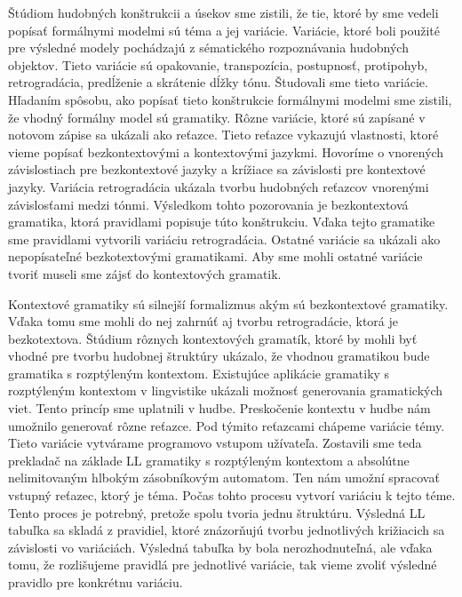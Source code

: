 Štúdiom hudobných konštrukcii a úsekov sme zistili, že tie, ktoré by sme vedeli popísať formálnymi modelmi sú téma a jej variácie. Variácie, ktoré boli použité pre výsledné modely pochádzajú z sématického rozpoznávania hudobných objektov. Tieto variácie sú opakovanie, transpozícia, postupnosť, protipohyb, retrogradácia, predĺženie a skrátenie dĺžky tónu. Študovali sme tieto variácie. Hľadaním spôsobu, ako popísať tieto konštrukcie formálnymi modelmi sme zistili, že vhodný formálny model sú gramatiky. Rôzne variácie, ktoré sú zapísané v notovom zápise sa ukázali ako reťazce. Tieto reťazce vykazujú vlastnosti, ktoré vieme popísať bezkontextovými a kontextovými jazykmi. Hovoríme o vnorených závislostiach pre bezkontextové jazyky a krížiace sa závislosti pre kontextové jazyky. Variácia retrogradácia ukázala tvorbu hudobných reťazcov vnorenými závislosťami medzi tónmi. Výsledkom tohto pozorovania je bezkontextová gramatika, ktorá pravidlami popisuje túto konštrukciu. Vďaka tejto gramatike sme pravidlami vytvorili variáciu retrogradácia. Ostatné variácie sa ukázali ako nepopísateľné bezkotextovými gramatikami. Aby sme mohli ostatné variácie tvoriť museli sme zájsť do kontextových gramatik.

Kontextové gramatiky sú silnejší formalizmus akým sú bezkontextové gramatiky. Vďaka tomu sme mohli do nej zahrnúť aj tvorbu retrogradácie, ktorá je bezkotextova. Štúdium rôznych kontextových gramatík, ktoré by mohli byť vhodné pre tvorbu hudobnej štruktúry ukázalo, že vhodnou gramatikou bude gramatika s rozptýleným kontextom. Existujúce aplikácie gramatiky s rozptýleným kontextom v lingvistike ukázali možnosť generovania gramatických viet. Tento princíp sme uplatnili v hudbe. Preskočenie kontextu v hudbe nám umožnilo generovať rôzne reťazce. Pod týmito reťazcami chápeme variácie témy. Tieto variácie vytvárame programovo vstupom užívateľa. Zostavili sme teda prekladač na základe LL gramatiky s rozptýleným kontextom a absolútne nelimitovaným hlbokým zásobníkovým automatom. Ten nám umožní spracovať vstupný reťazec, ktorý je téma. Počas tohto procesu vytvorí variáciu k tejto téme. Tento proces je potrebný, pretože spolu tvoria jednu štruktúru. Výsledná LL tabuľka sa skladá z pravidiel, ktoré znázorňujú tvorbu jednotlivých križiacich sa závislosti vo variáciách. Výsledná tabuľka by bola nerozhodnuteľná, ale vďaka tomu, že rozlišujeme pravidlá pre jednotlivé variácie, tak vieme zvoliť výsledné pravidlo pre konkrétnu variáciu.

